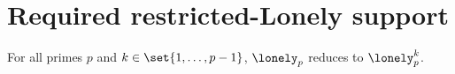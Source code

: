 \section*{Required restricted-Lonely support}
\setcounter{theorem}{43}
\begin{lemma}\label{lem:restricted-lonely}
	For all primes $p$ and $k \in \set{1, \ldots, p-1}$, $\lonely_p$ reduces to $\lonely_p^k$.
\end{lemma}